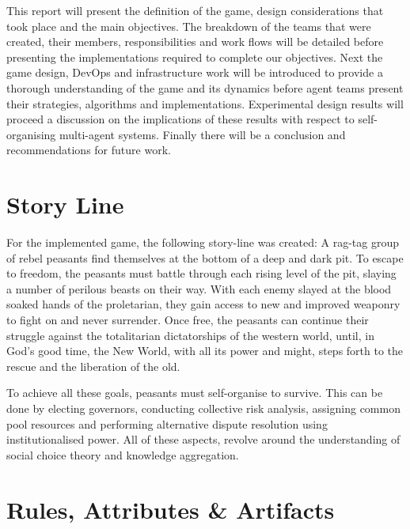 This report will present the definition of the game, design considerations that took place and the main objectives. The breakdown of the teams that were created, their members, responsibilities and work flows will be detailed before presenting the implementations required to complete our objectives. Next the game design, DevOps and infrastructure work will be introduced to provide a thorough understanding of the game and its dynamics before agent teams present their strategies, algorithms and implementations. Experimental design results will proceed a discussion on the implications of these results with respect to self-organising multi-agent systems. Finally there will be a conclusion and recommendations for future work. 

\section{Story Line}\label{sec:story line}

For the implemented game, the following story-line was created: A rag-tag group of rebel peasants find themselves at the bottom of a deep and dark pit. To escape to freedom, the peasants must battle through each rising level of the pit, slaying a number of perilous beasts on their way. With each enemy slayed at the blood soaked hands of the proletarian, they gain access to new and improved weaponry to fight on and never surrender. Once free, the peasants can continue their struggle against the totalitarian dictatorships of the western world, until, in God's good time, the New World, with all its power and might, steps forth to the rescue and the liberation of the old. \cite{churchill} 

To achieve all these goals, peasants must self-organise to survive. This can be done by electing governors, conducting collective risk analysis, assigning common pool resources and performing alternative dispute resolution using institutionalised power. All of these aspects, revolve around the understanding of social choice theory and knowledge aggregation. 


\section{Rules, Attributes \& Artifacts}\label{sec:rules}


